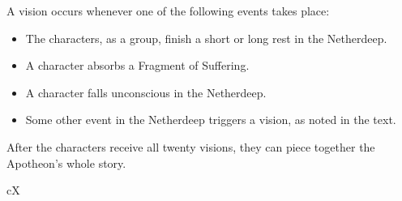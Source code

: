 \documentclass[10pt,a4paper,twoside,fancy,bg=print,twocolumn,openany,nodeprecatedcode]{dndbook}
\begin{document}
A vision occurs whenever one of the following events takes place:


\begin{itemize}
\item The characters, as a group, finish a short or long rest in the Netherdeep.
\item A character absorbs a Fragment of Suffering.
\item A character falls unconscious in the Netherdeep.
\item Some other event in the Netherdeep triggers a vision, as noted in the text.
\end{itemize}

After the characters receive all twenty visions, they can piece together the Apotheon's whole story.

\begin{DndTable}[header=Apotheon Lore]{cX}


\end{DndTable}
\end{document}
